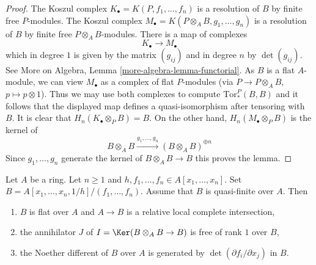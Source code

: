 \begin{proof}
The Koszul complex $K_\bullet = K(P, f_1, \ldots, f_n)$ is a resolution
of $B$ by finite free $P$-modules. The Koszul complex
$M_\bullet = K(P \otimes_A B, g_1, \ldots, g_n)$ is a resolution
of $B$ by finite free $P \otimes_A B$-modules. There is a map of
complexes
$$
K_\bullet \longrightarrow M_\bullet
$$
which in degree $1$ is given by the matrix $(g_{ij})$ and
in degree $n$ by $\det(g_{ij})$. See
More on Algebra, Lemma \ref{more-algebra-lemma-functorial}.
As $B$ is a flat $A$-module, we can view $M_\bullet$ as a complex
of flat $P$-modules (via $P \to P \otimes_A B$, $p \mapsto p \otimes 1$).
Thus we may use both complexes to compute $\text{Tor}_*^P(B, B)$ and
it follows that the displayed map defines a quasi-isomorphism after tensoring
with $B$. It is clear that $H_n(K_\bullet \otimes_P B) = B$.
On the other hand, $H_n(M_\bullet \otimes_P B)$ is the kernel of
$$
B \otimes_A B \xrightarrow{g_1, \ldots, g_n} (B \otimes_A B)^{\oplus n}
$$
Since $g_1, \ldots, g_n$ generate the kernel of $B \otimes_A B \to B$
this proves the lemma.
\end{proof}

\begin{lemma}
\label{lemma-quasi-finite-complete-intersection}
Let $A$ be a ring. Let $n \geq 1$ and
$h, f_1, \ldots, f_n \in A[x_1, \ldots, x_n]$.
Set $B = A[x_1, \ldots, x_n, 1/h]/(f_1, \ldots, f_n)$.
Assume that $B$ is quasi-finite over $A$.
Then
\begin{enumerate}
\item $B$ is flat over $A$ and $A \to B$ is a relative local complete
intersection,
\item the annihilator $J$ of $I = \Ker(B \otimes_A B \to B)$
is free of rank $1$ over $B$,
\item the Noether different of $B$ over $A$ is generated
by $\det(\partial f_i/\partial x_j)$ in $B$.
\end{enumerate}
\end{lemma}

